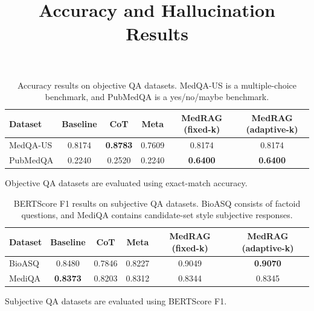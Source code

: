 \documentclass[11pt]{article}
\title{Accuracy and Hallucination Results}
\author{}
\date{}
\begin{document}
\maketitle

\begin{table}[H]
\centering
\caption{Accuracy results on objective QA datasets. MedQA-US is a multiple-choice benchmark, and PubMedQA is a yes/no/maybe benchmark.}
\label{tab:objective_accuracy}
\begin{threeparttable}
\small
\setlength{\tabcolsep}{9pt}
\begin{tabular}{lccccc}
\toprule
Dataset & Baseline & CoT & Meta & MedRAG (fixed-k) & MedRAG (adaptive-k) \\
\midrule
MedQA-US & 0.8174 & \textbf{0.8783} & 0.7609 & 0.8174 & 0.8174 \\
PubMedQA & 0.2240 & 0.2520 & 0.2240 & \textbf{0.6400} & \textbf{0.6400} \\
\bottomrule
\end{tabular}
\begin{tablenotes}[flushleft]
\footnotesize
\item Objective QA datasets are evaluated using exact-match accuracy.
\end{tablenotes}
\end{threeparttable}
\end{table}

\begin{table}[H]
\centering
\caption{BERTScore F1 results on subjective QA datasets. BioASQ consists of factoid questions, and MediQA contains candidate-set style subjective responses.}
\label{tab:subjective_accuracy}
\begin{threeparttable}
\small
\setlength{\tabcolsep}{9pt}
\begin{tabular}{lccccc}
\toprule
Dataset & Baseline & CoT & Meta & MedRAG (fixed-k) & MedRAG (adaptive-k) \\
\midrule
BioASQ & 0.8480 & 0.7846 & 0.8227 & 0.9049 & \textbf{0.9070} \\
MediQA & \textbf{0.8373} & 0.8203 & 0.8312 & 0.8344 & 0.8345 \\
\bottomrule
\end{tabular}
\begin{tablenotes}[flushleft]
\footnotesize
\item Subjective QA datasets are evaluated using BERTScore F1.
\end{tablenotes}
\end{threeparttable}
\end{table}
\end{document}

